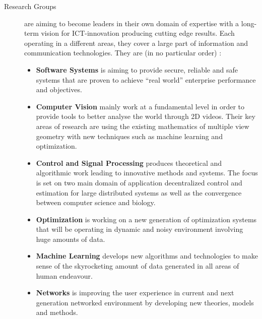 \documentclass[10pt]{report}
\begin{document}
\begin{description}
\item[Research Groups] are aiming to become leaders in their own domain of expertise with a long-term vision for ICT-innovation producing cutting edge results. Each operating in a different areas, they cover a large part of information and communication technologies. They are (in no particular order) :
\begin{itemize}
\item \textbf{Software Systems} is aiming to provide secure, reliable and safe systems that are proven to achieve \enquote{real world} enterprise performance and objectives. 
\item \textbf{Computer Vision} mainly work at a fundamental level in order to provide tools to better analyse the world through 2D videos. Their key areas of research are using the existing mathematics of multiple view geometry with new techniques such as machine learning and optimization.
\item \textbf{Control and Signal Processing} produces theoretical and algorithmic work leading to innovative methods and systems. The focus is set on two main domain of application decentralized control and estimation for large distributed systems as well as the convergence between computer science and biology.
\item \textbf{Optimization} is working on a new generation of optimization systems that will be operating in dynamic and noisy environment involving huge amounts of data.
\item \textbf{Machine Learning} develops new algorithms and technologies to make sense of the skyrocketing amount of data generated in all areas of human endeavour. 
\item \textbf{Networks} is improving the user experience in current and next generation networked environment by developing new theories, models and methods.
\end{itemize}


\end{description}
\end{document}
